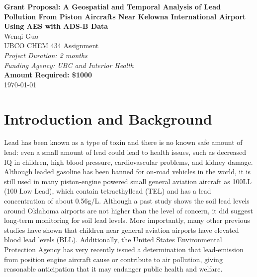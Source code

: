 \documentclass[12pt]{article}
\begin{document}
\begin{center}
    \Large{\textbf{Grant Proposal: A Geospatial and Temporal Analysis of Lead Pollution From Piston Aircrafts Near Kelowna International Airport Using AES with ADS-B Data}}\\
    \vspace{1cm}
    \large{Wenqi Guo}\\
    \vspace{0.5cm}
    \large{UBCO CHEM 434 Assignment}\\
    \vspace{0.5cm}
    \textit{Project Duration: 2 months}\\
    \vspace{0.5cm}
    \textit{Funding Agency: UBC and Interior Health}\\
    \vspace{0.5cm}
    \textbf{Amount Required: \$1000}\\
    \vspace{1cm}
    \vspace{1cm}
    \today
\end{center}
\newpage

\section{Introduction and Background}
Lead has been known as a type of toxin and there is no known safe amount of lead: even a small amount of lead could lead to health issues, such as decreased IQ in children, high blood pressure, cardiovascular problems, and kidney damage. \cite{world_health_organization_lead_2023} Although leaded gasoline has been banned for on-road vehicles in the world, it is still used in many piston-engine powered small general aviation aircraft as 100LL (100 Low Lead), which contain tetraethyllead (TEL) and has a lead concentration of about 0.56g/L. 
\cite{noauthor_safety_2021} Although a past study shows the soil lead levels around Oklahoma airports are not higher than the level of concern, it did suggest long-term monitoring for soil lead levels. \cite{mccumber_geospatial_2017} More importantly, many other previous studies have shown that children near general aviation airports have elevated blood lead levels (BLL). \cite{miranda_geospatial_2011} \cite{zahran_leaded_2023} \cite{mills_lead_2022} \cite{zahran_effect_2017} Additionally, the United States Environmental Protection Agency has very recently issued a determination that lead-emission from position engine aircraft cause or contribute to air pollution, giving reasonable anticipation that it may endanger public health and welfare. \cite{us_epa_epa_2023}
\end{document}
